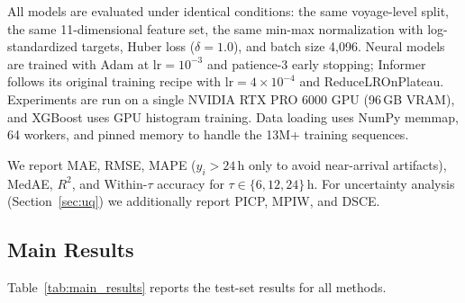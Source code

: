 \documentclass[sigconf,anonymous]{acmart}%
\begin{document}
All models are evaluated under identical conditions: the same voyage-level split, the same 11-dimensional feature set, the same min-max normalization with log-standardized targets, Huber loss ($\delta = 1.0$), and batch size 4,096. Neural models are trained with Adam at $\mathrm{lr}=10^{-3}$ and patience-3 early stopping; Informer follows its original training recipe with $\mathrm{lr}=4\times 10^{-4}$ and ReduceLROnPlateau. Experiments are run on a single NVIDIA RTX PRO 6000 GPU (96\,GB VRAM), and XGBoost uses GPU histogram training. Data loading uses NumPy memmap, 64 workers, and pinned memory to handle the 13M+ training sequences.

We report MAE, RMSE, MAPE ($y_i{>}24$\,h only to avoid near-arrival artifacts), MedAE, $R^2$, and Within-$\tau$ accuracy for $\tau{\in}\{6,12,24\}$\,h. For uncertainty analysis (Section~\ref{sec:uq}) we additionally report PICP, MPIW, and DSCE.


\subsection{Main Results}

Table~\ref{tab:main_results} reports the test-set results for all methods.
\end{document}
